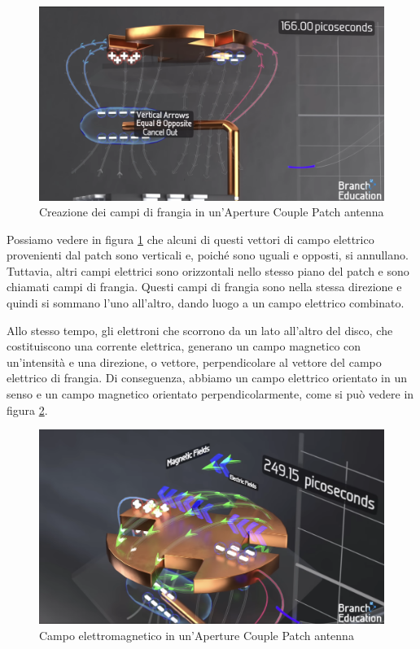 \begin{figure}[htbp]
  \centering
  \includegraphics[width=0.8\linewidth]{./res/img/antenna_fringing_fields.png}
  \caption{Creazione dei campi di frangia in un'Aperture Couple Patch antenna \cite{branch_education_how_2022}}
  \label{fig:aperture-couple-patch-antenna-fringing-fields}
\end{figure}

Possiamo vedere in figura \ref{fig:aperture-couple-patch-antenna-fringing-fields} che alcuni di questi vettori di campo elettrico provenienti dal patch sono verticali e, poiché sono uguali e opposti, si annullano.
Tuttavia, altri campi elettrici sono orizzontali nello stesso piano del patch e sono chiamati campi di frangia.
Questi campi di frangia sono nella stessa direzione e quindi si sommano l'uno all'altro, dando luogo a un campo elettrico combinato.

Allo stesso tempo, gli elettroni che scorrono da un lato all'altro del disco, che costituiscono una corrente elettrica, generano un campo magnetico con un'intensità e una direzione, o vettore, perpendicolare al vettore del campo elettrico di frangia.
Di conseguenza, abbiamo un campo elettrico orientato in un senso e un campo magnetico orientato perpendicolarmente, come si può vedere in figura \ref{fig:aperture-couple-patch-antenna-em-field}.

\begin{figure}[htbp]
  \centering
  \includegraphics[width=0.8\linewidth]{./res/img/antenna_em_field.png}
  \caption{Campo elettromagnetico in un'Aperture Couple Patch antenna \cite{branch_education_how_2022}}
  \label{fig:aperture-couple-patch-antenna-em-field}
\end{figure}

